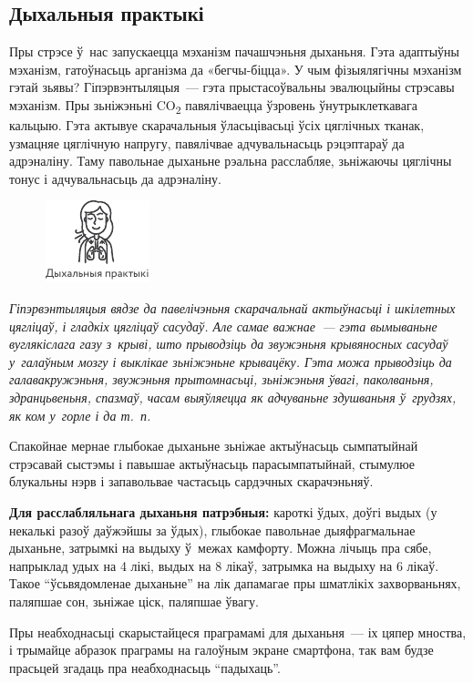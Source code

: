 \subsection*{Дыхальныя практыкі}

Пры стрэсе ў~нас запускаецца мэханізм пачашчэньня дыханьня. Гэта адаптыўны мэханізм, гатоўнасьць арганізма да «бегчы-біцца». У чым фізыялягічны мэханізм гэтай зьявы? Гіпэрвэнтыляцыя~--- гэта прыстасоўвальны эвалюцыйны стрэсавы мэханізм. Пры зьніжэньні CO\textsubscript{2} павялічваецца ўзровень ўнутрыклеткавага кальцыю. Гэта актывуе скарачальныя ўласьцівасьці ўсіх цяглічных тканак, узмацняе цяглічную напругу, павялічвае адчувальнасьць рэцэптараў да адрэналіну. Таму павольнае дыханьне рэальна расслабляе, зьніжаючы цяглічны тонус і адчувальнасьць да адрэналіну.

\begin{figure}[htb!]
  \centering
  \includegraphics[scale=1.5]{willpower/ch7/22.pdf}
\end{figure}

\emph{Гіпэрвэнтыляцыя вядзе да павелічэньня скарачальнай актыўнасьці і шкілетных цягліцаў, і гладкіх цягліцаў сасудаў. Але самае важнае~--- гэта вымываньне вуглякіслага газу з~крыві, што прыводзіць да звужэньня крывяносных сасудаў у~галаўным мозгу і выклікае зьніжэньне крывацёку. Гэта можа прыводзіць да галавакружэньня, звужэньня прытомнасьці, зьніжэньня ўвагі, паколваньня, здранцьвеньня, спазмаў, часам выяўляецца як адчуваньне здушваньня ў~грудзях, як ком у~горле і да т.~п.}

Спакойнае мернае глыбокае дыханьне зьніжае актыўнасьць сымпатыйнай стрэсавай сыстэмы і павышае актыўнасьць парасымпатыйнай, стымулюе блукальны нэрв і запавольвае частасьць сардэчных скарачэньняў.

\textbf{Для расслабляльнага дыханьня патрэбныя:} кароткі ўдых, доўгі выдых (у некалькі разоў даўжэйшы за ўдых), глыбокае павольнае дыяфрагмальнае дыханьне, затрымкі на выдыху ў~межах камфорту. Можна лічыць пра сябе, напрыклад удых на 4 лікі, выдых на 8 лікаў, затрымка на выдыху на 6 лікаў. Такое ``ўсьвядомленае дыханьне'' на лік дапамагае пры шматлікіх захворваньнях, паляпшае сон, зьніжае ціск, паляпшае ўвагу. 

Пры неабходнасьці скарыстайцеся праграмамі для дыханьня~--- іх цяпер мноства, і трымайце абразок праграмы на галоўным экране смартфона, так вам будзе прасьцей згадаць пра неабходнасьць ``падыхаць''.

